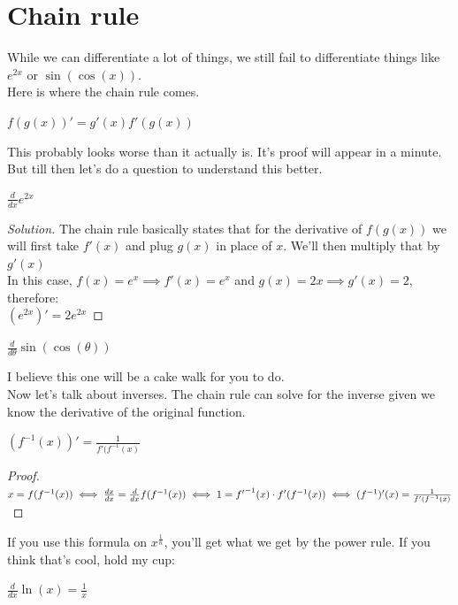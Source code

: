 \section{Chain rule}
While we can differentiate a lot of things, we still fail to differentiate things like $e^{2x}$ or $\sin(\cos(x))$.\\
Here is where the chain rule comes.\\
\begin{theorem}
    $f(g(x))'=g'(x)f'(g(x))$
\end{theorem}
This probably looks worse than it actually is. It's proof will appear in a minute. But till then let's do a question to understand this better.\\
\begin{example}
    $\frac{d}{dx} e^{2x}$
\end{example}
\begin{proof}
    [Solution]
    The chain rule basically states that for the derivative of $f(g(x))$ we will first take $f'(x)$ and plug $g(x)$ in place of $x$. We'll then multiply that by $g'(x)$\\
    In this case, $f(x)=e^x \implies f'(x)=e^x$ and $g(x)=2x \implies g'(x)=2$, therefore:\\
    $(e^{2x})'=2e^{2x}$
\end{proof}
\begin{example}
    $\frac{d}{d\theta}\sin(\cos(\theta))$
\end{example}
I believe this one will be a cake walk for you to do.\\
Now let's talk about inverses. The chain rule can solve for the inverse given we know the derivative of the original function.\\
\begin{theorem}
    $(f^{-1}(x))'=\frac{1}{f'(f^{-1}(x)}$
\end{theorem}
\begin{proof}
    $x=f(f^{-1}(x))\\
    \iff \frac{dx}{dx}=\frac{d}{dx}f(f^{-1}(x))\\
    \iff 1=f{'}^{-1}(x) \cdot f'(f^{-1}(x))\\
    \iff (f^{-1})'(x)=\frac{1}{f'(f^{-1}(x)}$
\end{proof}
If you use this formula on $x^{\frac{1}{n}}$, you'll get what we get by the power rule. If you think that's cool, hold my cup:\\
\begin{theorem}
    $\frac{d}{dx} \ln(x)=\frac{1}{x}$
\end{theorem}
